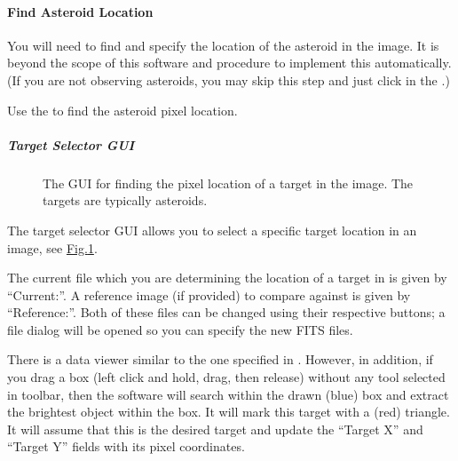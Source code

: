 \documentclass[letterpaper,11pt,english]{sphinxmanual}
\begin{document}
\paragraph{Find Asteroid Location}
\label{\detokenize{user/manual_mode:find-asteroid-location}}\label{\detokenize{user/manual_mode:user-manual-mode-procedure-find-asteroid-location}}
\sphinxAtStartPar
You will need to find and specify the location of the asteroid in the image.
It is beyond the scope of this software and procedure to implement this
automatically. (If you are not observing asteroids, you may skip this step
and just click  in the
{\hyperref[\detokenize{user/manual_mode:user-manual-mode-procedure-find-asteroid-location-target-selector-gui}]{}}.)

\sphinxAtStartPar
Use the {\hyperref[\detokenize{user/manual_mode:user-manual-mode-procedure-find-asteroid-location-target-selector-gui}]{}}
to find the asteroid pixel location.


\subparagraph{Target Selector GUI}
\label{\detokenize{user/manual_mode:target-selector-gui}}\label{\detokenize{user/manual_mode:user-manual-mode-procedure-find-asteroid-location-target-selector-gui}}
\begin{figure}[htbp]
\centering
\capstart

\noindent{}
\caption{The GUI for finding the pixel location of a target in the image. The
targets are typically asteroids.}\label{\detokenize{user/manual_mode:id4}}\label{\detokenize{user/manual_mode:figure-target-selector-gui}}\end{figure}

\sphinxAtStartPar
The target selector GUI allows you to select a specific target location in
an image, see \hyperref[\detokenize{user/manual_mode:figure-target-selector-gui}]{Fig.\@ \ref{\detokenize{user/manual_mode:figure-target-selector-gui}}}.

\sphinxAtStartPar
The current file which you are determining the location of a target in is
given by “Current:”. A reference image (if provided) to compare against is
given by “Reference:”. Both of these files can be changed using their
respective  buttons; a file dialog will be opened so you can specify
the new FITS files.

\sphinxAtStartPar
There is a data viewer similar to the one specified in
{\hyperref[\detokenize{user/manual_mode:user-manual-mode-graphical-user-interface}]{}}. However, in addition, if you
drag a box (left click and hold, drag, then release) without any tool selected
in toolbar, then the software will search within the drawn (blue) box and
extract the brightest object within the box. It will mark this target with a
(red) triangle. It will assume that this is the desired target and update the
“Target X” and “Target Y” fields with its pixel coordinates.
\end{document}
